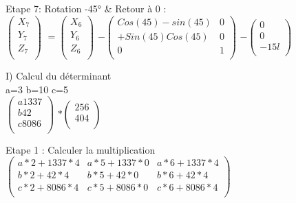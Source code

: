 Etape 7: Rotation -45° & Retour à 0 : \\

$
\begin{pmatrix}
  X_{7} \\
  Y_{7} \\
  Z_{7} \\
\end{pmatrix}
$
\vspace{5mm} %
$
=
\begin{pmatrix}
  X_{6} \\
  Y_{6} \\
  Z_{6} \\
\end{pmatrix}
$
\vspace{5mm} %
$
 -
\begin{pmatrix}
  Cos(45)-sin(45) & 0  \\
  +Sin(45)Cos(45) & 0 \\
  0 & 1 \\
\end{pmatrix}
$
$
 -
\begin{pmatrix}
  0  \\
  0 \\
  -15l \\
\end{pmatrix}
$

\vspace{15mm} %

I) Calcul du déterminant \\

a=3 b=10 c=5 \\

$
\begin{pmatrix}
  a 1337 \\
  b 42 \\
  c 8086 \\
\end{pmatrix}
$
\vspace{5mm} %
$
*
\begin{pmatrix}
  2 5 6 \\
  4 0 4 \\
\end{pmatrix}
$
\vspace{5mm} %

Etape 1 :  Calculer la multiplication \\

\vspace{3mm} %
$
\begin{pmatrix}
  a*2+1337*4 & a*5+1337*0  & a*6+1337*4 \\
  b*2+42*4   & b*5+42*0    & b*6+42*4   \\
  c*2+8086*4 & c*5+8086*0  & c*6+8086*4 \\
\end{pmatrix}
$
\vspace{5mm} %

